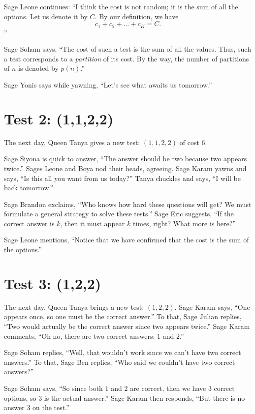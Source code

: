 \documentclass[12pt,reqno]{article}
\theoremstyle{plain}
\theoremstyle{definition}
\theoremstyle{remark}
\begin{document}
Sage Leone continues: ``I think the cost is not random; it is the sum of all the options. Let us denote it by $C$. By our definition, we have
\[c_1 + c_2 + \dots + c_K = C.\]''

Sage Soham says, ``The cost of such a test is the sum of all the values. Thus, such a test corresponds to a \textit{partition} of its cost. By the way, the number of partitions of $n$ is denoted by $p(n)$.''

Sage Yonis says while yawning, ``Let's see what awaits us tomorrow.''

\section{Test 2: (1,1,2,2)}

The next day, Queen Tanya gives a new test: $(1,1,2,2)$ of cost $6$.

Sage Siyona is quick to answer, ``The answer should be two because two appears twice.'' 
Sages Leone and Boya nod their heads, agreeing. Sage Karam yawns and says, ``Is this all you want from us today?'' Tanya chuckles and says, ``I will be back tomorrow.''

Sage Brandon exclaims, ``Who knows how hard these questions will get? We must formulate a general strategy to solve these tests.'' Sage Eric suggests, ``If the correct answer is $k$, then it must appear $k$ times, right? What more is here?''

Sage Leone mentions, ``Notice that we  have confirmed that the cost is the sum of the options.''



\section{Test 3: (1,2,2)}

The next day, Queen Tanya brings a new test: $(1,2,2)$. Sage Karam says, ``One appears once, so one must be the correct answer.'' To that, Sage Julian replies, ``Two would actually be the correct answer since two appears twice.'' 
Sage Karam comments, ``Oh no, there are two correct answers: $1$ and $2$.''

Sage Soham replies, ``Well, that wouldn't work since we can't have two correct answers.'' To that, Sage Ben replies, ``Who said we couldn't have two correct answers?''

Sage Soham says, ``So since both $1$ and $2$ are correct, then we have $3$ correct options, so $3$ is the actual answer.'' Sage Karam then responds, ``But there is no answer $3$ on the test.''
\end{document}
